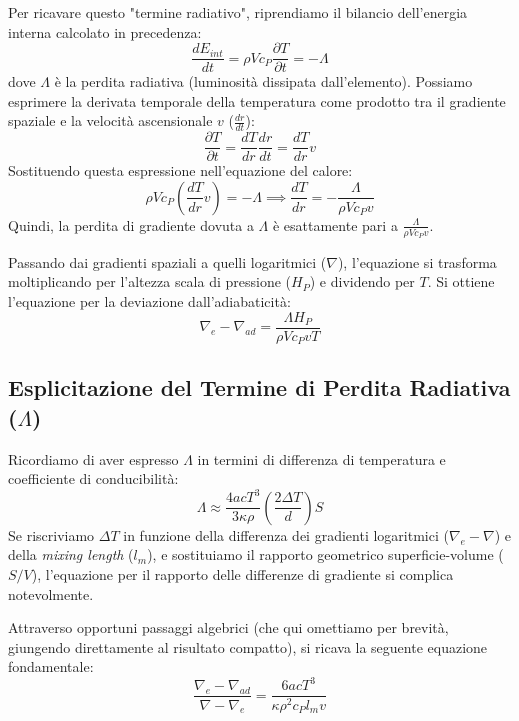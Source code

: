Per ricavare questo "termine radiativo", riprendiamo il bilancio dell'energia interna calcolato in precedenza:
\begin{equation}
\frac{d E_{int}}{dt} = \rho V c_P \frac{\partial T}{\partial t} = - \Lambda
\end{equation}
dove $\Lambda$ è la perdita radiativa (luminosità dissipata dall'elemento).
Possiamo esprimere la derivata temporale della temperatura come prodotto tra il gradiente spaziale e la velocità ascensionale $v$ ($\frac{dr}{dt}$):
\begin{equation}
\frac{\partial T}{\partial t} = \frac{dT}{dr} \frac{dr}{dt} = \frac{dT}{dr} v
\end{equation}
Sostituendo questa espressione nell'equazione del calore:
\begin{equation}
\rho V c_P \left( \frac{dT}{dr} v \right) = - \Lambda \implies \frac{dT}{dr} = - \frac{\Lambda}{\rho V c_P v}
\end{equation}
Quindi, la perdita di gradiente dovuta a $\Lambda$ è esattamente pari a $\frac{\Lambda}{\rho V c_P v}$.

Passando dai gradienti spaziali a quelli logaritmici ($\nabla$), l'equazione si trasforma moltiplicando per l'altezza scala di pressione ($H_P$) e dividendo per $T$. Si ottiene l'equazione per la deviazione dall'adiabaticità:
\begin{equation}
\nabla_e - \nabla_{ad} = \frac{\Lambda H_P}{\rho V c_P v T}
\end{equation}

\subsection{Esplicitazione del Termine di Perdita Radiativa ($\Lambda$)}
Ricordiamo di aver espresso $\Lambda$ in termini di differenza di temperatura e coefficiente di conducibilità:
\begin{equation}
\Lambda \approx \frac{4 a c T^3}{3 \kappa \rho} \left( \frac{2 \Delta T}{d} \right) S
\end{equation}
Se riscriviamo $\Delta T$ in funzione della differenza dei gradienti logaritmici ($\nabla_e - \nabla$) e della \textit{mixing length} ($l_m$), e sostituiamo il rapporto geometrico superficie-volume ($S/V$), l'equazione per il rapporto delle differenze di gradiente si complica notevolmente.

Attraverso opportuni passaggi algebrici (che qui omettiamo per brevità, giungendo direttamente al risultato compatto), si ricava la seguente equazione fondamentale:
\begin{equation}
\frac{\nabla_e - \nabla_{ad}}{\nabla - \nabla_e} = \frac{6 a c T^3}{\kappa \rho^2 c_P l_m v}
\end{equation}

